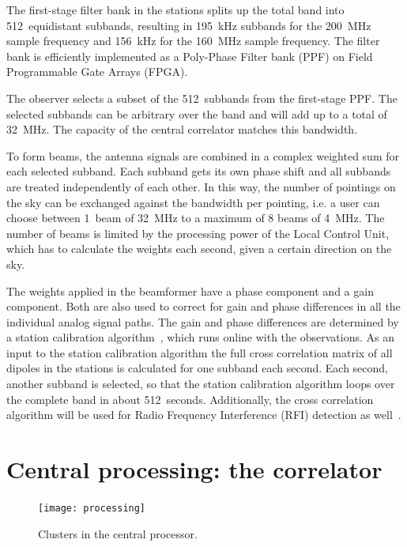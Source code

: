 \documentclass[journal]{IEEEtran}
\begin{document}
The first-stage filter bank in the stations splits up the total band into
512~equidistant subbands, resulting in 195~kHz subbands for the 200~MHz
sample frequency and 156~kHz for the 160~MHz sample frequency.
The filter bank is efficiently implemented as a Poly-Phase Filter bank (PPF)
on Field Programmable Gate Arrays (FPGA).

The observer selects a subset of the 512~subbands from the first-stage PPF.
The selected subbands can be arbitrary over the band and will add up to a
total of 32~MHz.
The capacity of the central correlator matches this bandwidth.

To form beams, the antenna signals are combined in a complex weighted sum
for each selected subband.
Each subband gets its own phase shift and all subbands are treated
independently of each other.
In this way, the number of pointings on the sky can be exchanged against
the bandwidth per pointing, i.e. a user can choose between 1~beam of 32~MHz
to a maximum of 8 beams of 4~MHz.
The number of beams is limited by the processing power of the Local Control
Unit, which has to calculate the weights each second, given a certain
direction on the sky. 

The weights applied in the beamformer have a phase component and a gain
component.
Both are also used to correct for gain and phase differences in all the
individual analog signal paths.
The gain and phase differences are determined by a station calibration
algorithm~\cite{stefan:06}, which runs online with the observations.
As an input to the station calibration algorithm the full cross correlation
matrix of all dipoles in the stations is calculated for one subband each
second.
Each second, another subband is selected, so that the station calibration
algorithm loops over the complete band in about 512~seconds.
Additionally, the cross correlation algorithm will be used for
Radio Frequency Interference (RFI) detection as well~\cite{Boonstra:05}.

\section{Central processing: the correlator}
\label{sec:corr}

\begin{figure}
\begin{center}
\texttt{[image: processing]}
\end{center}
\caption{Clusters in the central processor.}
\label{fig:CEP}
\end{figure}
\end{document}
